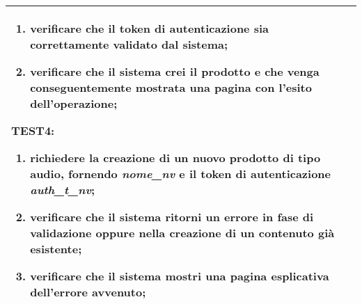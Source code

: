 \begin{table}[hb]
\begin{tabular}{ |p{2cm}|p{10cm}|  }
\begin{enumerate}[nosep, topsep=0pt]
            \item verificare che il token di autenticazione sia correttamente validato dal sistema;
            \item verificare che il sistema crei il prodotto e che venga conseguentemente mostrata una pagina con l'esito dell'operazione;
        \end{enumerate}
        \vspace{0.5cm} TEST4:
        \begin{enumerate}[nosep, topsep=0pt]
            \item richiedere la creazione di un nuovo prodotto di tipo audio, fornendo \emph{nome\_nv} e il token di autenticazione \emph{auth\_t\_nv};
            \item verificare che il sistema ritorni un errore in fase di validazione oppure nella creazione di un contenuto già esistente;
            \item verificare che il sistema mostri una pagina esplicativa dell'errore avvenuto;
        \end{enumerate}
        \\\hline
    \end{tabular}
\end{table}